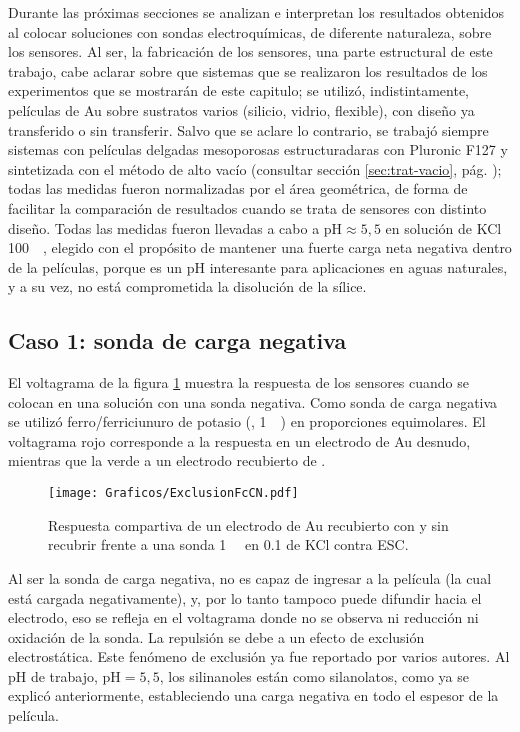	 Durante las próximas secciones se analizan e interpretan los resultados obtenidos al colocar soluciones con sondas electroquímicas, de diferente naturaleza, sobre los sensores. Al ser, la fabricación de los sensores, una parte estructural de este trabajo, cabe aclarar sobre que sistemas que se realizaron los resultados de los experimentos que se mostrarán de este capitulo; se utilizó, indistintamente, películas de Au sobre sustratos varios (silicio, vidrio, flexible), con diseño ya transferido o sin transferir. Salvo que se aclare lo contrario, se trabajó siempre sistemas con películas delgadas mesoporosas estructuradaras con Pluronic F127 y sintetizada con el método de alto vacío (consultar sección \ref{sec:trat-vacio}, pág. \pageref{sec:trat-vacio}); todas las medidas fueron normalizadas por el área geométrica, de forma de facilitar la comparación de resultados cuando se trata de sensores con distinto diseño. Todas las medidas fueron llevadas a cabo a $\text{pH}\approx5,5$ en solución de KCl \SI{100}{\milli\Molar}, elegido con el propósito de mantener una fuerte carga neta negativa dentro de la películas, porque es un pH interesante para aplicaciones en aguas naturales, y a su vez, no está comprometida la disolución de la sílice.

	\subsection{Caso 1: sonda de carga negativa}

	 El voltagrama de la figura \ref{fig:exclusion_vs_Au} muestra la respuesta de los sensores cuando se colocan en una solución con una sonda negativa. Como sonda de carga negativa se utilizó ferro/ferriciunuro de potasio (\ferroferri, \SI{1}{\milli\Molar}) en proporciones equimolares. El voltagrama rojo corresponde a la respuesta en un electrodo de Au desnudo, mientras que la verde a un electrodo recubierto de \pdm.
	
			\begin{figure}[ht]
				\centering
		 	    \texttt{[image: Graficos/ExclusionFcCN.pdf]}
		        \caption[Exclusión electrostática]{Respuesta compartiva de un electrodo de Au recubierto con \pdmF\space y sin recubrir frente a una sonda \ferroferri \SI{1}{\milli\Molar} en \SI{0.1}{\Molar} de KCl contra ESC.}
		        \label{fig:exclusion_vs_Au}
		      	\end{figure}
	
	 Al ser la sonda de carga negativa, no es capaz de ingresar a la película (la cual está cargada negativamente), y, por lo tanto tampoco puede difundir hacia el electrodo, eso se refleja en el voltagrama donde no se observa ni reducción ni oxidación de la sonda. La repulsión se debe a un efecto de exclusión electrostática. Este fenómeno de exclusión ya fue reportado por varios autores\cite{alberti2015,schmuhl2005,Andrieu-Brunsen2015,brunsen2011}. Al pH de trabajo, $\text{pH}=5,5$, los silinanoles están como silanolatos, como ya se explicó anteriormente, estableciendo una carga negativa en todo el espesor de la película.

